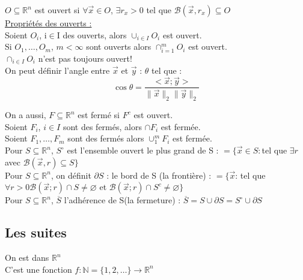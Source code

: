 \documentclass[../main.tex]{subfiles}
\begin{document}
$O \subseteq \mathbb{R}^n$ est ouvert si $\forall \vec{x} \in O$, $\exists r_x>0$ tel que $\mathcal{B}(\vec{x}, r_x) \subseteq O$\\

\quad \underline{Propriétés des ouverts :}\\
Soient $O_i$, i$\in$I des ouverts, alors $\cup_{i\in I} O_i$ est ouvert.\\
Si $O_1, \dots, O_m$, $m<\infty$ sont ouverts alors $\cap_{i=1}^m O_i$ est ouvert.\\

\warning $\cap_{i\in I} O_i$ n'est pas toujours ouvert!\\

On peut définir l'angle entre $\vec{x}$ et $\vec{y}$ : $\theta$ tel que :\\
\begin{equation}
    \cos{\theta} = \frac{<\vec{x}; \vec{y}>}{\parallel \vec{x}\parallel_2 \parallel \vec{y}\parallel_2}
\end{equation}

On a aussi, $F\subseteq \mathbb{R}^n$ est fermé si $F^c$ est ouvert.\\

Soient $F_i$, $i \in I$ sont des fermés, alors $\cap F_i$ est fermée.\\
Soient $F_1, \dots, F_m$ sont des fermés alors $\cup_1^m F_i$ est fermée.\\

Pour $S\subseteq \mathbb{R}^n$, $S^{\circ}$ est l'ensemble ouvert le plus grand de S : $= \{\vec{x} \in S :$tel que $\exists r$ avec $\mathcal{B}(\vec{x}, r)\subseteq S\}$\\

Pour $S\subseteq \mathbb{R}^n$, on définit $\partial S$ : le bord de S (la frontière) : $=\{\vec{x}$: tel que $\forall r>0 \mathcal{B}(\vec{x}; r) \cap S\neq \varnothing$ et $\mathcal{B}(\vec{x}; r) \cap S^c \neq \varnothing\}$\\

Pour $S\subseteq \mathbb{R}^n$, $\overline{S}$ l'adhérence de S(la fermeture) : $\overline{S} = S\cup \partial S = S^{\circ} \cup \partial S$\\


\subsection{Les suites}
On est dans $\mathbb{R}^n$\\
C'est une fonction $f:\mathbb{N} = \{1,2,\dots\} \rightarrow \mathbb{R}^n$\\
\end{document}
